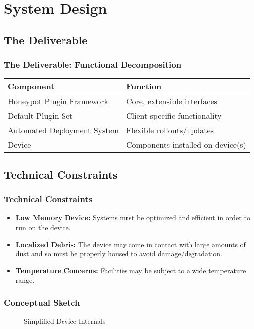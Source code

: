 \section{System Design}

\subsection{The Deliverable}
\begin{frame}
\frametitle{The Deliverable: Functional Decomposition}

\begin{tabular}{l | l}
\toprule
\textbf{Component} & \textbf{Function} \\
\midrule
Honeypot Plugin Framework & Core, extensible interfaces \\
Default Plugin Set & Client-specific functionality \\
Automated Deployment System & Flexible rollouts/updates \\
Device & Components installed on device(s) \\
\bottomrule
\end{tabular}
\end{frame}

\subsection{Technical Constraints}
\begin{frame}
\frametitle{Technical Constraints}

\begin{itemize}
\item \textbf{Low Memory Device: }Systems must be optimized and efficient in order to run on the device.
\item \textbf{Localized Debris: }The device may come in contact with large amounts of dust and so must be properly housed to avoid damage/degradation.
\item \textbf{Temperature Concerns: }Facilities may be subject to a wide temperature range. 
\end{itemize}
\end{frame}

\begin{frame}
\frametitle{Conceptual Sketch}
\begin{figure}
\centering
{
\scalebox{.7}{}
}
\caption{Simplified Device Internals}
\end{figure}
\end{frame}

